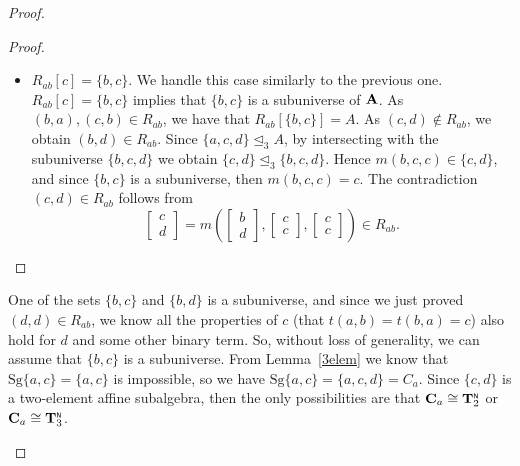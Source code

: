 \documentclass[11pt]{amsart}
\newcommand{\m}[1]{\mathbf{\uppercase{#1}}}
\newcommand{\n}{\scriptscriptstyle{\mathsf{N}}}
\theoremstyle{definition}
\theoremstyle{remark}
\theoremstyle{plain}
\begin{document}
\begin{proof}
\begin{enumerate}[wide, labelwidth=!,itemindent=!,labelindent=0pt]
\begin{enumerate}[wide, labelwidth=!,labelindent=0pt,itemindent=!]
\begin{enumerate}[wide, labelwidth=!,labelindent=0pt,itemindent=!]
\begin{proof}
\begin{itemize}[leftmargin=*]
\item $R_{ab}[c]=\{b,c\}.$ We handle this case similarly to the previous one. $R_{ab}[c]=\{b,c\}$ implies that $\{b,c\}$ is a subuniverse of $\m a$. As $(b,a),(c,b)\in R_{ab}$, we have that $R_{ab}[\{b,c\}]=A$. As $(c,d)\notin R_{ab}$, we obtain $(b,d)\in R_{ab}.$ Since $\{a,c,d\}\trianglelefteq_3 A$, by intersecting with the subuniverse $\{b,c,d\}$ we obtain $\{c,d\}\trianglelefteq_3\{b,c,d\}$. Hence $m(b,c,c)\in \{c,d\}$, and since $\{b,c\}$ is a subuniverse, then $m(b,c,c)=c$. The contradiction $(c,d)\in R_{ab}$ follows from
$$
\begin{bmatrix}
c \\
d
\end{bmatrix}=
m\left(
\begin{bmatrix}
b \\
d
\end{bmatrix}, 
\begin{bmatrix}
c \\
c
\end{bmatrix},
\begin{bmatrix}
c \\
c
\end{bmatrix}
\right)\in R_{ab}.
$$
\end{itemize} 
\end{proof}




One of the sets $\{b,c\}$ and $\{b,d\}$ is a subuniverse, and since we just proved $(d,d)\in R_{ab}$, we know all the properties of $c$ (that $t(a,b)=t(b,a)=c$) also hold for $d$ and some other binary term. So, without loss of generality, we can assume that $\{b,c\}$ is a subuniverse. From Lemma~\ref{3elem} we know that $\mathrm{Sg}\{a,c\}=\{a,c\}$ is impossible, so we have $\mathrm{Sg}\{a,c\}=\{a,c,d\}=C_a$. Since $\{c,d\}$ is a two-element affine subalgebra, then the only possibilities are that $\m C_a\cong {\m T}_2^{\n}$ or $\m C_a\cong {\m T}_3^{\n}$.


\end{enumerate}
\end{enumerate}
\end{enumerate}
\end{proof}
\end{document}
